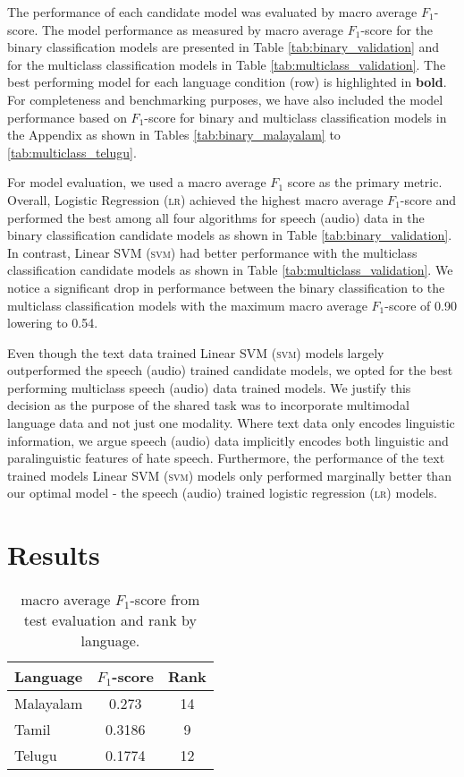 \documentclass[11pt]{article}
\begin{document}
    The performance of each candidate model was evaluated by macro average $F_1$-score. The model performance as measured by macro average $F_1$-score for the binary classification models are presented in Table \ref{tab:binary_validation} and for the multiclass classification models in Table \ref{tab:multiclass_validation}. The best performing model for each language condition (row) is highlighted in \textbf{bold}. For completeness and benchmarking purposes, we have also included the model performance based on $F_1$-score for binary and multiclass classification models in the Appendix as shown in Tables \ref{tab:binary_malayalam} to \ref{tab:multiclass_telugu}.

    For model evaluation, we used a macro average $F_1$ score as the primary metric. Overall, Logistic Regression (\textsc{lr}) achieved the highest macro average $F_1$-score and performed the best among all four algorithms for speech (audio) data in the binary classification candidate models as shown in Table \ref{tab:binary_validation}. In contrast, Linear SVM (\textsc{svm}) had better performance with the multiclass classification candidate models as shown in Table \ref{tab:multiclass_validation}. We notice a significant drop in performance between the binary classification to the multiclass classification models with the maximum macro average $F_1$-score of 0.90 lowering to 0.54.

    Even though the text data trained Linear SVM (\textsc{svm}) models largely outperformed the speech (audio) trained candidate models, we opted for the best performing multiclass speech (audio) data trained models. We justify this decision as the purpose of the shared task was to incorporate multimodal language data and not just one modality. Where text data only encodes linguistic information, we argue speech (audio) data implicitly encodes both linguistic and paralinguistic features of hate speech. Furthermore, the performance of the text trained models Linear SVM (\textsc{svm})  models only performed marginally better than our optimal model - the speech (audio) trained logistic regression (\textsc{lr}) models.

\section{Results}
\label{sec:results}

     \begin{table}[]
        \caption{\label{tab:test_evaluation} macro average $F_1$-score from test evaluation and rank by language.}
        \centering
        \begin{tabular}{lcc}
            \hline
            Language & $F_1$-score & Rank \\
            \hline
            Malayalam & 0.273 & 14 \\
            Tamil & 0.3186 & 9 \\
            Telugu & 0.1774 & 12 \\
            \hline
         \end{tabular}
     \end{table}
\end{document}
